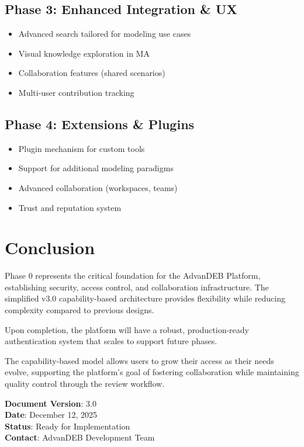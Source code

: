 \documentclass[12pt,a4paper]{article}
\begin{document}
\subsection{Phase 3: Enhanced Integration \& UX}
\begin{itemize}
    \item Advanced search tailored for modeling use cases
    \item Visual knowledge exploration in MA
    \item Collaboration features (shared scenarios)
    \item Multi-user contribution tracking
\end{itemize}

\subsection{Phase 4: Extensions \& Plugins}
\begin{itemize}
    \item Plugin mechanism for custom tools
    \item Support for additional modeling paradigms
    \item Advanced collaboration (workspaces, teams)
    \item Trust and reputation system
\end{itemize}

\section{Conclusion}

Phase 0 represents the critical foundation for the AdvanDEB Platform, establishing security, access control, and collaboration infrastructure. The simplified v3.0 capability-based architecture provides flexibility while reducing complexity compared to previous designs.

Upon completion, the platform will have a robust, production-ready authentication system that scales to support future phases.

The capability-based model allows users to grow their access as their needs evolve, supporting the platform's goal of fostering collaboration while maintaining quality control through the review workflow.

\vspace{1cm}

\noindent\textbf{Document Version}: 3.0\\
\textbf{Date}: December 12, 2025\\
\textbf{Status}: Ready for Implementation\\
\textbf{Contact}: AdvanDEB Development Team
\end{document}
